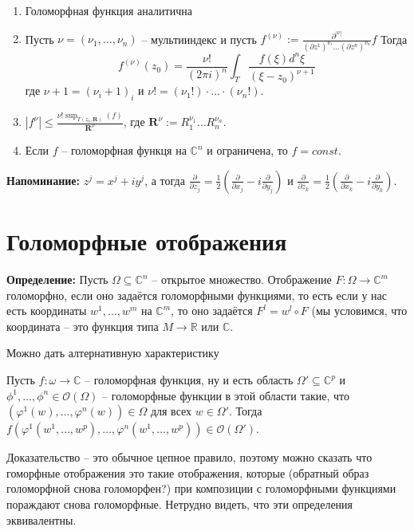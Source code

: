 \sled
\begin{enumerate}
    \item Голоморфная функция аналитична

    \item Пусть $\nu=(\nu_1,\ldots,\nu_n)$ – мультииндекс и пусть
        $f^{(\nu)}:=\frac{\partial^{|\nu|}}{(\partial z^1)^{\nu_1}\ldots(\partial z^n)^{\nu_n}}f$
        Тогда
        \[f^{(\nu)}(z_0)=\frac{\nu!}{(2\pi i)^n}\int_T\frac{f(\xi)d^n\xi}{(\xi-z_0)^{\nu+1}}\]
        где $\nu+1=(\nu_i+1)_i$ и $\nu!=(\nu_1!)\cdot\ldots\cdot(\nu_n!)$.

    \item $|f^{\nu}|\leq\frac{\nu!\sup_{T(z_0,\mathbf R)}(f)}{\mathbf R^\nu}$,
        где $\mathbf R^\nu:=R_1^{\nu_1}\ldots R_n^{\nu_n}$.

    \item Если $f$ – голоморфная функця на $\mathbb C^n$ и ограничена, то $f=const$.
\end{enumerate}

\textbf{Напоминание:} $z^j=x^j+iy^j$, а тогда $\frac{\partial}{\partial z_j}=
\frac{1}{2}(\frac{\partial}{\partial x_j}-i\frac{\partial}{\partial y_j})$ и
$\frac{\partial}{\partial \overline z_k}=\frac{1}{2}(\frac{\partial}{\partial
x_k}-i\frac{\partial}{\partial y_k})$.

\section{Голоморфные отображения}
\textbf{Определение:} Пусть $\Omega\subseteq\mathbb C^n$ – открытое множество.
Отображение $F:\Omega\rightarrow\mathbb C^m$ голоморфно, если оно задаётся
голоморфными функциями, то есть если у нас есть координаты $w^1,\ldots,w^m$ на
$\mathbb C^m$, то оно задаётся $F^l=w^l\circ F$ (мы условимся, что координата
– это функция типа $M\rightarrow \mathbb R$ или $\mathbb C$.

Можно дать алтернативную характеристику

\utv Пусть $f:\omega\rightarrow\mathbb C$ – голоморфная функция,
ну и есть область $\Omega'\subseteq\mathbb C^p$ и $\phi^1,\ldots,\phi^n\in\mathcal
O(\Omega)$ – голоморфные функции в этой области такие, что $(\varphi^1(w),\ldots,
\varphi^n(w))\in\Omega$ для всех $w \in\Omega'$. Тогда $f(\varphi^1(w^1,\ldots,w^p)
,\ldots,\varphi^n(w^1,\ldots,w^p))\in\mathcal O(\Omega')$.

Доказательство – это обычное цепное правило, поэтому можно сказать что гоморфные
отображения это такие отображения, которые (обратный образ голоморфной снова голоморфен?)
при композиции с голоморфными функциями пораждают снова голоморфные. Нетрудно видеть,
что эти определения эквивалентны.

